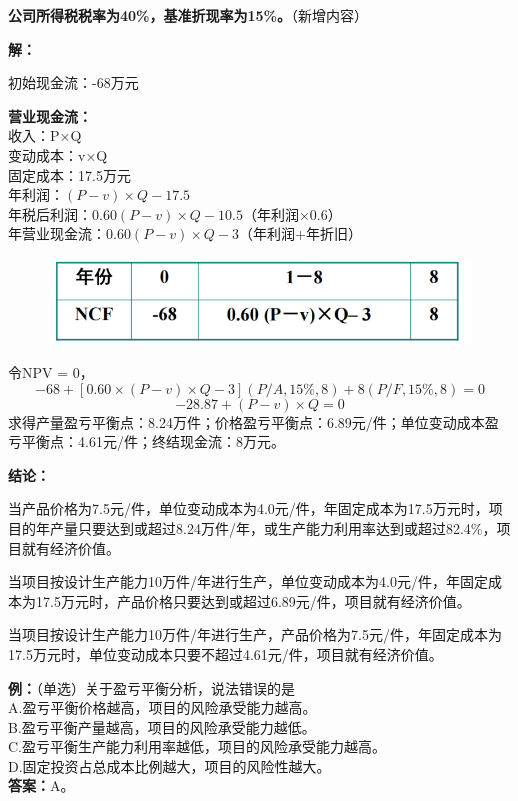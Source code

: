 \textbf{公司所得税税率为40\%，基准折现率为15\%。}（新增内容）

\textbf{解：}

初始现金流：-68万元

\noindent \textbf{营业现金流：}\\
收入：P×Q\\
变动成本：v×Q\\
固定成本：17.5万元\\
年利润：$(P-v)×Q-17.5$\\
年税后利润：$0.60 (P-v)×Q - 10.5$（年利润×0.6）\\
年营业现金流：$0.60 (P-v)×Q-3$（年利润+年折旧）

\begin{figure}[H]
    \centering
    \includegraphics[width=0.75\linewidth]{image/表1.png}
\end{figure}

\noindent 令NPV = 0，
$$-68 +[0.60 \times (P − v) \times Q − 3](P/ A,15\%,8) + 8(P/ F,15\%,8) = 0$$
$$− 28.87 + (P −v) \times Q = 0$$
求得产量盈亏平衡点：8.24万件；价格盈亏平衡点：6.89元/件；单位变动成本盈亏平衡点：4.61元/件；终结现金流：8万元。

\noindent \textbf{结论：}

当产品价格为7.5元/件，单位变动成本为4.0元/件，年固定成本为17.5万元时，项目的年产量只要达到或超过8.24万件/年，或生产能力利用率达到或超过82.4\%，项目就有经济价值。

当项目按设计生产能力10万件/年进行生产，单位变动成本为4.0元/件，年固定成本为17.5万元时，产品价格只要达到或超过6.89元/件，项目就有经济价值。

当项目按设计生产能力10万件/年进行生产，产品价格为7.5元/件，年固定成本为17.5万元时，单位变动成本只要不超过4.61元/件，项目就有经济价值。

\noindent \textbf{例：}（单选）关于盈亏平衡分析，说法错误的是\\
A.盈亏平衡价格越高，项目的风险承受能力越高。\\
B.盈亏平衡产量越高，项目的风险承受能力越低。\\
C.盈亏平衡生产能力利用率越低，项目的风险承受能力越高。\\
D.固定投资占总成本比例越大，项目的风险性越大。\\
\textbf{答案：}A。

